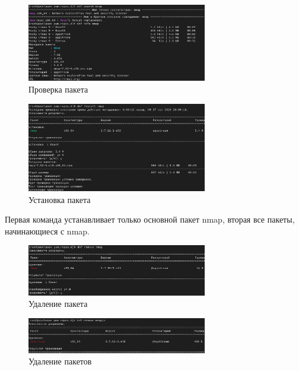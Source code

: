 \documentclass[
  12pt,
  a4paper,
  DIV=11,
  numbers=noendperiod]{scrreprt}
\begin{document}
\begin{figure}

{\centering \includegraphics[width=0.7\textwidth,height=\textheight]{image/4.png}

}

\caption{Проверка пакета}

\end{figure}%
\begin{figure}

{\centering \includegraphics[width=0.7\textwidth,height=\textheight]{image/5.png}

}

\caption{Установка пакета}

\end{figure}%

Первая команда устанавливает только основной пакет nmap, вторая все
пакеты, начинающиеся с nmap.

\begin{figure}

{\centering \includegraphics[width=0.7\textwidth,height=\textheight]{image/6.png}

}

\caption{Удаление пакета}

\end{figure}%
\begin{figure}

{\centering \includegraphics[width=0.7\textwidth,height=\textheight]{image/7.png}

}

\caption{Удаление пакетов}

\end{figure}%
\end{document}
